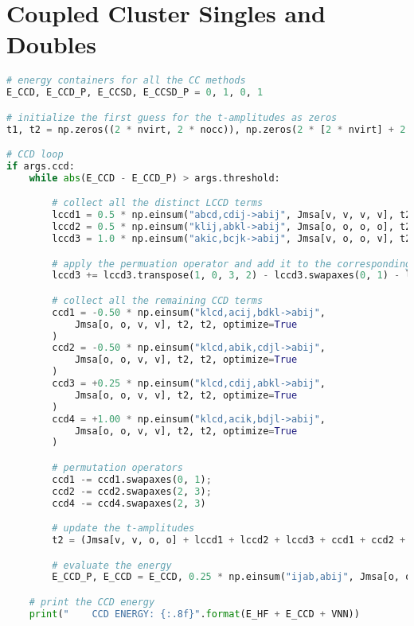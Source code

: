 \section*{\texorpdfstring{Coupled Cluster Singles and Doubles\label{sec:cc_code_solution}}{Coupled Cluster Singles and Doubles}}

\raggedbottom\begin{lstlisting}[language=Python, caption={\acrshort{ccd} and \acrshort{ccsd} method exercise code solution.}, label=code:cc_solution]
# energy containers for all the CC methods
E_CCD, E_CCD_P, E_CCSD, E_CCSD_P = 0, 1, 0, 1

# initialize the first guess for the t-amplitudes as zeros
t1, t2 = np.zeros((2 * nvirt, 2 * nocc)), np.zeros(2 * [2 * nvirt] + 2 * [2 * nocc])

# CCD loop
if args.ccd:
    while abs(E_CCD - E_CCD_P) > args.threshold:

        # collect all the distinct LCCD terms
        lccd1 = 0.5 * np.einsum("abcd,cdij->abij", Jmsa[v, v, v, v], t2, optimize=True)
        lccd2 = 0.5 * np.einsum("klij,abkl->abij", Jmsa[o, o, o, o], t2, optimize=True)
        lccd3 = 1.0 * np.einsum("akic,bcjk->abij", Jmsa[v, o, o, v], t2, optimize=True)

        # apply the permuation operator and add it to the corresponding LCCD terms
        lccd3 += lccd3.transpose(1, 0, 3, 2) - lccd3.swapaxes(0, 1) - lccd3.swapaxes(2, 3)

        # collect all the remaining CCD terms
        ccd1 = -0.50 * np.einsum("klcd,acij,bdkl->abij",
            Jmsa[o, o, v, v], t2, t2, optimize=True
        )
        ccd2 = -0.50 * np.einsum("klcd,abik,cdjl->abij",
            Jmsa[o, o, v, v], t2, t2, optimize=True
        )
        ccd3 = +0.25 * np.einsum("klcd,cdij,abkl->abij",
            Jmsa[o, o, v, v], t2, t2, optimize=True
        )
        ccd4 = +1.00 * np.einsum("klcd,acik,bdjl->abij",
            Jmsa[o, o, v, v], t2, t2, optimize=True
        )

        # permutation operators
        ccd1 -= ccd1.swapaxes(0, 1);
        ccd2 -= ccd2.swapaxes(2, 3);
        ccd4 -= ccd4.swapaxes(2, 3)

        # update the t-amplitudes
        t2 = (Jmsa[v, v, o, o] + lccd1 + lccd2 + lccd3 + ccd1 + ccd2 + ccd3 + ccd4) / Emsd

        # evaluate the energy
        E_CCD_P, E_CCD = E_CCD, 0.25 * np.einsum("ijab,abij", Jmsa[o, o, v, v], t2)

    # print the CCD energy
    print("    CCD ENERGY: {:.8f}".format(E_HF + E_CCD + VNN))


\end{lstlisting}
